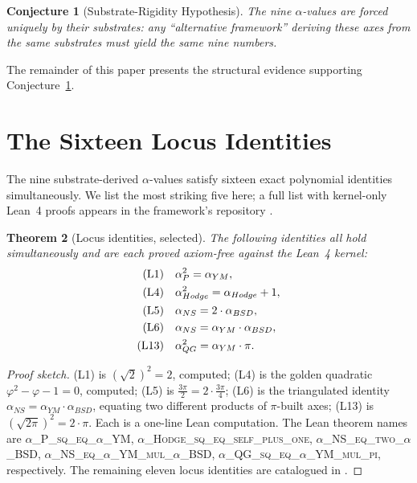 \documentclass[11pt,a4paper]{amsart}
\theoremstyle{plain}
\newtheorem{theorem}{Theorem}[section]
\newtheorem{conjecture}[theorem]{Conjecture}
\theoremstyle{definition}
\newcommand{\aP}{\alpha_{P}}
\newcommand{\aYM}{\alpha_{YM}}
\newcommand{\aNS}{\alpha_{NS}}
\newcommand{\aBSD}{\alpha_{BSD}}
\newcommand{\aHodge}{\alpha_{Hodge}}
\newcommand{\aQG}{\alpha_{QG}}
\newcommand{\golden}{\varphi}
\begin{document}
\begin{conjecture}[Substrate-Rigidity Hypothesis]
\label{conj:substrate}
The nine $\alpha$-values are forced uniquely by their substrates: any
``alternative framework'' deriving these axes from the same substrates
must yield the same nine numbers.
\end{conjecture}

The remainder of this paper presents the structural evidence
supporting Conjecture~\ref{conj:substrate}.

\section{The Sixteen Locus Identities}
\label{sec:locus}

The nine substrate-derived $\alpha$-values satisfy sixteen exact
polynomial identities simultaneously. We list the most striking five
here; a full list with kernel-only Lean~4 proofs appears in the
framework's repository \cite{principiaFractalisRepo}.

\begin{theorem}[Locus identities, selected]
\label{thm:locus}
The following identities all hold simultaneously and are each proved
axiom-free against the Lean~4 kernel:
\begin{align}
\textnormal{(L1)}\quad &\aP^{2} = \aYM, \\
\textnormal{(L4)}\quad &\aHodge^{2} = \aHodge + 1, \\
\textnormal{(L5)}\quad &\aNS = 2 \cdot \aBSD, \\
\textnormal{(L6)}\quad &\aNS = \aYM \cdot \aBSD, \\
\textnormal{(L13)}\quad &\aQG^{2} = \aYM \cdot \pi.
\end{align}
\end{theorem}

\begin{proof}[Proof sketch]
(L1) is $(\sqrt 2)^{2} = 2$, computed; (L4) is the golden quadratic
$\golden^{2} - \golden - 1 = 0$, computed; (L5) is
$\tfrac{3\pi}{2} = 2 \cdot \tfrac{3\pi}{4}$; (L6) is the triangulated
identity $\aNS = \aYM \cdot \aBSD$, equating two different products of
$\pi$-built axes; (L13) is $(\sqrt{2\pi})^{2} = 2 \cdot \pi$.
Each is a one-line Lean computation. The Lean theorem names are
\textsc{$\alpha$\_P\_sq\_eq\_$\alpha$\_YM}, \textsc{$\alpha$\_Hodge\_sq\_eq\_self\_plus\_one},
\textsc{$\alpha$\_NS\_eq\_two\_$\alpha$\_BSD}, \textsc{$\alpha$\_NS\_eq\_$\alpha$\_YM\_mul\_$\alpha$\_BSD},
\textsc{$\alpha$\_QG\_sq\_eq\_$\alpha$\_YM\_mul\_pi}, respectively. The
remaining eleven locus identities are catalogued in
\cite{principiaFractalisRepo}.
\end{proof}
\end{document}
